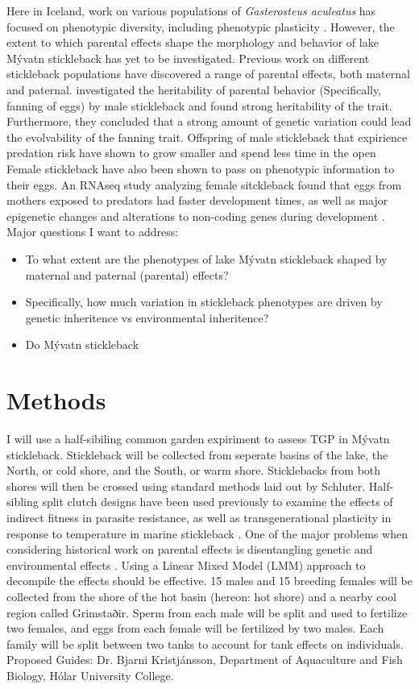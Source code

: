 \documentclass[12pt]{extarticle}
\begin{document}
Here in Iceland, work on various populations of \textit{Gasterosteus aculeatus} has focused on phenotypic diversity, including phenotypic plasticity \citep{Kristjansson2002, Millet2013}. However, the extent to which parental effects shape the morphology and behavior of lake M\'yvatn stickleback has yet to be investigated. Previous work on different stickleback populations have discovered a range of parental effects, both maternal and paternal. \citet{Bell2018} investigated the heritability of parental behavior (Specifically, fanning of eggs) by male stickleback and found strong heritability of the trait. Furthermore, they concluded that a strong amount of genetic variation could lead the evolvability of the fanning trait. Offspring of male stickleback that expirience predation risk have shown to grow smaller and spend less time in the open \citep{Bell2016, Stein2014} Female stickleback have also been shown to pass on phenotypic information to their eggs. An RNAseq study analyzing female sitckleback found that eggs from mothers exposed to predators had faster development times, as well as major epigenetic changes and alterations to non-coding genes during development \citep{Mommer2014, Bell2016}.  \\


Major questions I want to address:
\begin{itemize}
 \item To what extent are the phenotypes of lake M\'yvatn stickleback 
shaped by maternal and paternal (parental) effects?
 \item Specifically, how much variation in stickleback phenotypes are driven by genetic inheritence vs environmental inheritence?
 \item Do M\'yvatn stickleback 
\end{itemize}


\section*{Methods}
I will use a half-sibiling common garden expiriment to assess TGP in M\'yvatn stickleback. Stickleback will be collected from seperate basins of the lake, the North, or cold shore, and the South, or warm shore. Sticklebacks from both shores will then be crossed using standard methods laid out by Schluter. Half-sibling split clutch designs have been used previously to examine the effects of indirect fitness in parasite resistance, as well as transgenerational plasticity in response to temperature in marine stickleback \citep{Barber2001,Ramler2014}. One of the major problems when considering historical work on parental effects is disentangling genetic and environmental effects \citep{Donelson2018}. Using a Linear Mixed Model (LMM) approach to decompile the effects should be effective.
15 males and 15 breeding females will be collected from the shore of the hot basin (hereon: hot shore) and a nearby cool region called Grimstaðir. Sperm from each male will be split and used to fertilize two females, and eggs from each female will be fertilized by two males. Each family will be split between two tanks to account for tank effects on individuals.
\\

Proposed Guides: Dr. Bjarni Kristj\'ansson, Department of Aquaculture and Fish Biology, H\'olar University College.

\end{document}
